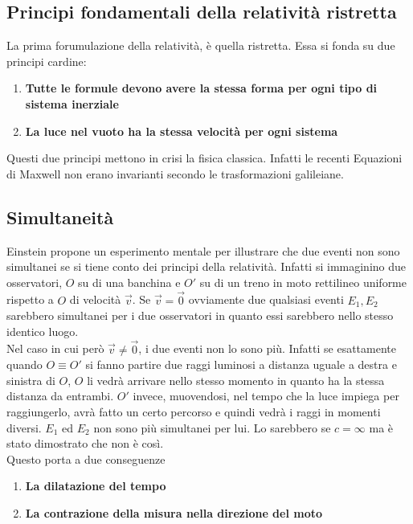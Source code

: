 \subsection{Principi fondamentali della relatività ristretta}
La prima forumulazione della relatività, è quella ristretta. Essa si fonda su due principi cardine:
\begin{enumerate}
  \item \textbf{Tutte le formule devono avere la stessa forma per ogni tipo di sistema inerziale}
  \item \textbf{La luce nel vuoto ha la stessa velocità per ogni sistema} 
\end{enumerate}
Questi due principi mettono in crisi la fisica classica. Infatti le recenti Equazioni di Maxwell non
erano invarianti secondo le trasformazioni galileiane.

\subsection{Simultaneità}
Einstein propone un esperimento mentale per illustrare che due eventi non sono simultanei se si tiene
conto dei principi della relatività. Infatti si immaginino due osservatori, $O$ su di una banchina
e $O'$ su di un treno in moto rettilineo uniforme rispetto a $O$ di velocità $\vec{v}$. Se 
$\vec{v}=\vec{0}$ ovviamente due qualsiasi eventi $E_1,E_2$ sarebbero simultanei per i due 
osservatori in quanto essi sarebbero nello stesso identico luogo.\\
Nel caso in cui però $\vec{v}\neq\vec{0}$, i due eventi non lo sono più. Infatti se esattamente 
quando $O\equiv O'$ si fanno partire due raggi luminosi a distanza uguale a destra e sinistra di $O$,
$O$ li vedrà arrivare nello stesso momento in quanto ha la stessa distanza da entrambi. $O'$ invece,
muovendosi, nel tempo che la luce impiega per raggiungerlo, avrà fatto un certo percorso e quindi 
vedrà i raggi in momenti diversi. $E_1$ ed $E_2$ non sono più simultanei per lui. Lo sarebbero se
$c=\infty$ ma è stato dimostrato che non è così.\\
Questo porta a due conseguenze
\begin{enumerate}
  \item \textbf{La dilatazione del tempo}
  \item \textbf{La contrazione della misura nella direzione del moto} 
\end{enumerate}


